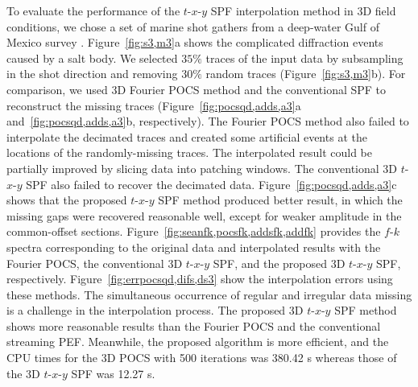 To evaluate the performance of the $t$-$x$-$y$ SPF interpolation
method in 3D field conditions, we chose a set of marine shot gathers
from a deep-water Gulf of Mexico survey
\cite[]{Fomel02,Liu11}. Figure~\ref{fig:s3,m3}a shows the complicated
diffraction events caused by a salt body.  We selected $35\%$ traces
of the input data by subsampling in the shot direction and removing
$30\%$ random traces (Figure~\ref{fig:s3,m3}b). For comparison, we
used 3D Fourier POCS method and the conventional SPF to
reconstruct the missing traces (Figure~\ref{fig:pocsqd,adds,a3}a
and~\ref{fig:pocsqd,adds,a3}b, respectively). The Fourier POCS method
also failed to interpolate the decimated traces and created some
artificial events at the locations of the randomly-missing traces. The
interpolated result could be partially improved by slicing data into
patching windows. The conventional 3D $t$-$x$-$y$ SPF also failed to
recover the decimated data. Figure~\ref{fig:pocsqd,adds,a3}c shows
that the proposed $t$-$x$-$y$ SPF method produced better result, in
which the missing gaps were recovered reasonable well, except for
weaker amplitude in the common-offset sections.
Figure~\ref{fig:seanfk,pocsfk,addsfk,addfk} provides the $f$-$k$
spectra corresponding to the original data and interpolated results
with the Fourier POCS, the conventional 3D $t$-$x$-$y$ SPF, and the
proposed 3D $t$-$x$-$y$ SPF,
respectively. Figure~\ref{fig:errpocsqd,difs,ds3} show the
interpolation errors using these methods. The simultaneous occurrence
of regular and irregular data missing is a challenge in the
interpolation process.  The proposed 3D $t$-$x$-$y$ SPF method shows
more reasonable results than the Fourier POCS and the conventional
streaming PEF.  Meanwhile, the proposed algorithm is more efficient,
and the CPU times for the 3D POCS with 500 iterations was 380.42 s
whereas those of the 3D $t$-$x$-$y$ SPF was 12.27 s.


